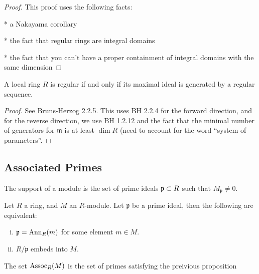 \begin{proof}
  This proof uses the following facts:

  * a Nakayama corollary
  
  * the fact that regular rings are integral domains

  * the fact that you can't have a proper containment
    of integral domains with the same dimension
\end{proof}

\begin{proposition}
  \label{prop:reg_loc_maximal_reg_seq}
  A local ring $R$ is regular if and only if
  its maximal ideal is generated by a regular sequence.
\end{proposition}

\begin{proof}
  See Bruns-Herzog 2.2.5. This uses BH 2.2.4 for the forward
  direction,
  and for the reverse direction, we use BH 1.2.12 and the fact that
  the minimal number of generators for $\mathfrak{m}$ is at least
  $\dim R$ (need to account for the word ``system of parameters''.
\end{proof}

\subsection{Associated Primes}

\begin{definition}
  \label{def:support_module}
  The support of a module is the set of prime ideals
  $\mathfrak{p} \subset R$ such that 
  $M_\mathfrak{p} \neq 0$.
\end{definition}

\begin{proposition}
  \label{prop:assoc_primes_def_equiv}
  Let $R$ a ring, and $M$ an $R$-module.
  Let $\mathfrak{p}$ be a prime ideal, 
  then 
  the following are equivalent:
  \begin{enumerate}[(i)]
    \item $\mathfrak{p} = \text{Ann}_R (m)$ for some element 
      $m \in M$.
    \item $R / \mathfrak{p}$ embeds into $M$.
  \end{enumerate}
\end{proposition}

\begin{definition}
  \label{def:assoc_primes}
  The set $\text{Assoc}_R (M)$ is the set of
  primes satisfying the preivious proposition
\end{definition}

